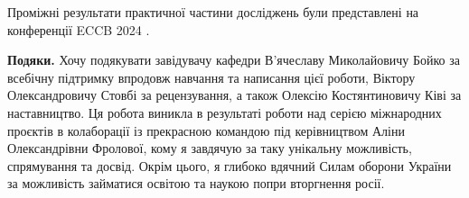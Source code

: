 Проміжні результати практичної частини досліджень були представлені на конференції ECCB 2024 \cite{fastlbp2024}.

\textbf{Подяки.}
Хочу подякувати завідувачу кафедри В'ячеславу Миколайовичу Бойко за всебічну підтримку впродовж навчання та написання цієї роботи, 
Віктору Олександровичу Стовбі за рецензування, а також Олексію Костянтиновичу Ківі за наставництво.
Ця робота виникла в результаті роботи над серією міжнародних проєктів в колаборації із прекрасною командою під керівництвом Аліни Олександрівни Фролової, 
кому я завдячую за таку унікальну можливість, спрямування та досвід.
Окрім цього, я глибоко вдячний Силам оборони України за можливість займатися освітою та наукою попри вторгнення росії. 
